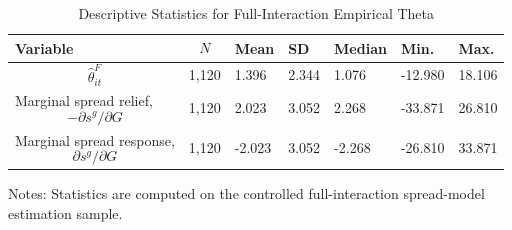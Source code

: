 \begin{table}[H]\centering
\begin{threeparttable}
\caption{Descriptive Statistics for Full-Interaction Empirical Theta}
\label{tab:theta_descriptive_stats}
\scriptsize
\begin{tabularx}{\textwidth}{lYYYYYY}
\toprule
Variable & $$N$$ & Mean & SD & Median & Min. & Max. \\
\midrule
$$\widehat{\theta}^{F}_{it}$$ & 1,120 & 1.396 & 2.344 & 1.076 & -12.980 & 18.106 \\
Marginal spread relief, $$-\partial s^g/\partial G$$ & 1,120 & 2.023 & 3.052 & 2.268 & -33.871 & 26.810 \\
Marginal spread response, $$\partial s^g/\partial G$$ & 1,120 & -2.023 & 3.052 & -2.268 & -26.810 & 33.871 \\
\bottomrule
\end{tabularx}
\begin{tablenotes}[flushleft]\footnotesize
\item Notes: Statistics are computed on the controlled full-interaction spread-model estimation sample.
\end{tablenotes}
\end{threeparttable}
\end{table}
